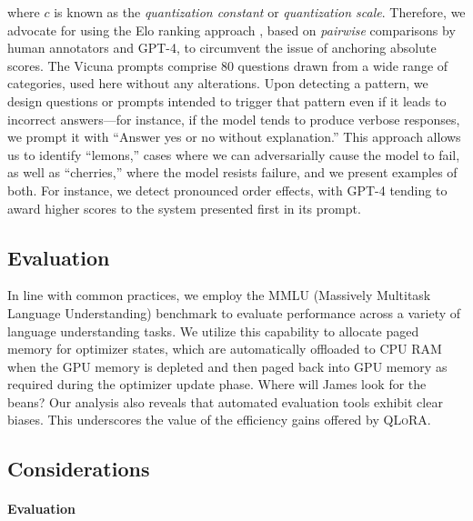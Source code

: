 where $c$ is known as the {\em quantization constant} or {\em quantization scale}. Therefore, we advocate for using the Elo ranking approach \citep{elo1967proposed}, based on \textit{pairwise} comparisons by human annotators and GPT-4, to circumvent the issue of anchoring absolute scores. The Vicuna prompts comprise 80 questions drawn from a wide range of categories, used here without any alterations. Upon detecting a pattern, we design questions or prompts intended to trigger that pattern even if it leads to incorrect answers—for instance, if the model tends to produce verbose responses, we prompt it with “Answer yes or no without explanation.” This approach allows us to identify “lemons,” cases where we can adversarially cause the model to fail, as well as “cherries,” where the model resists failure, and we present examples of both. For instance, we detect pronounced order effects, with GPT-4 tending to award higher scores to the system presented first in its prompt. \subsection{Evaluation}

In line with common practices, we employ the MMLU (Massively Multitask Language Understanding) benchmark \citep{hendrycksmeasuring} to evaluate performance across a variety of language understanding tasks. We utilize this capability to allocate paged memory for optimizer states, which are automatically offloaded to CPU RAM when the GPU memory is depleted and then paged back into GPU memory as required during the optimizer update phase. Where will James look for the beans? Our analysis also reveals that automated evaluation tools exhibit clear biases. This underscores the value of the efficiency gains offered by \textsc{QLoRA}. \subsection{Considerations}
\label{ssec:considerations}

\paragraph{Evaluation}

